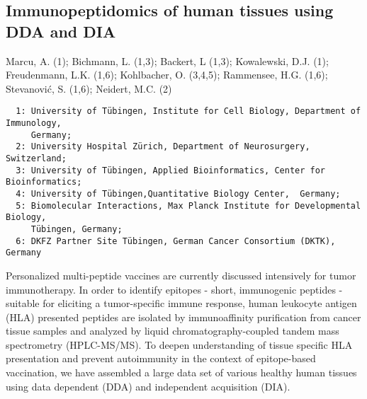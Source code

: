 {\subsection*{\color{eubicRed} Immunopeptidomics of human tissues using DDA and DIA}
{\color{eubicGray}Marcu, A. (1);
Bichmann, L. (1,3);
Backert, L (1,3);
Kowalewski, D.J. (1);
Freudenmann, L.K. (1,6);
Kohlbacher, O. (3,4,5);
Rammensee, H.G. (1,6);
Stevanović, S. (1,6);
Neidert, M.C. (2)}
{\color{eubicGray}\begin{verbatim}
  1: University of Tübingen, Institute for Cell Biology, Department of Immunology,
     Germany;
  2: University Hospital Zürich, Department of Neurosurgery, Switzerland;
  3: University of Tübingen, Applied Bioinformatics, Center for Bioinformatics;
  4: University of Tübingen,Quantitative Biology Center,  Germany;
  5: Biomolecular Interactions, Max Planck Institute for Developmental Biology,
     Tübingen, Germany;
  6: DKFZ Partner Site Tübingen, German Cancer Consortium (DKTK), Germany
\end{verbatim}}

Personalized multi-peptide vaccines are currently discussed intensively for tumor immunotherapy. In order to identify epitopes - short, immunogenic peptides - suitable for eliciting a tumor-specific immune response, human leukocyte antigen (HLA) presented peptides are isolated by immunoaffinity purification from cancer tissue samples and analyzed by liquid chromatography-coupled tandem mass spectrometry (HPLC-MS/MS). To deepen understanding of tissue specific HLA presentation and prevent autoimmunity in the context of epitope-based vaccination, we have assembled a large data set of various healthy human tissues using data dependent (DDA) and independent acquisition (DIA).

}%
